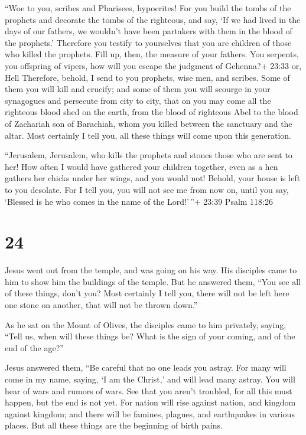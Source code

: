 ``Woe to you, scribes and Pharisees, hypocrites! For you
build the tombs of the prophets and decorate the tombs of the righteous,
 and say, `If we had lived in the days of our fathers, we
wouldn't have been partakers with them in the blood of the prophets.'
 Therefore you testify to yourselves that you are children
of those who killed the prophets.  Fill up, then, the
measure of your fathers.  You serpents, you offspring of
vipers, how will you escape the judgment of Gehenna?+ 23:33 or, Hell
 Therefore, behold, I send to you prophets, wise men, and
scribes. Some of them you will kill and crucify; and some of them you
will scourge in your synagogues and persecute from city to city,
 that on you may come all the righteous blood shed on the
earth, from the blood of righteous Abel to the blood of Zachariah son of
Barachiah, whom you killed between the sanctuary and the altar.
 Most certainly I tell you, all these things will come upon
this generation.

 ``Jerusalem, Jerusalem, who kills the prophets and stones
those who are sent to her! How often I would have gathered your children
together, even as a hen gathers her chicks under her wings, and you
would not!  Behold, your house is left to you desolate.
 For I tell you, you will not see me from now on, until you
say, `Blessed is he who comes in the name of the Lord!'\,''+ 23:39 Psalm
118:26

\hypertarget{section-23}{%
\section{24}\label{section-23}}

 Jesus went out from the temple, and was going on his way.
His disciples came to him to show him the buildings of the temple.
 But he answered them, ``You see all of these things, don't
you? Most certainly I tell you, there will not be left here one stone on
another, that will not be thrown down.''

 As he sat on the Mount of Olives, the disciples came to him
privately, saying, ``Tell us, when will these things be? What is the
sign of your coming, and of the end of the age?''

 Jesus answered them, ``Be careful that no one leads you
astray.  For many will come in my name, saying, `I am the
Christ,' and will lead many astray.  You will hear of wars
and rumors of wars. See that you aren't troubled, for all this must
happen, but the end is not yet.  For nation will rise
against nation, and kingdom against kingdom; and there will be famines,
plagues, and earthquakes in various places.  But all these
things are the beginning of birth pains.

